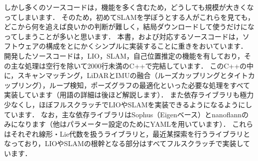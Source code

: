 しかし多くのソースコードは，機能を多く含むため，どうしても規模が大きくなってしまいます．
そのため，初めてSLAMを学ぼうとする人がこれらを見ても，どこから何を追えば良いかの判断が難しく，結局ダウンロードして使うだけになってしまうことが多いと思います．
本書，および対応するソースコードは，ソフトウェアの構成をとにかくシンプルに実装することに重きをおいています．
開発したソースコードは，LIO，SLAM，自己位置推定の機能を有しており，その主な処理は空行を除いて2000行未満のC++で完結しています．
このC++の中に，スキャンマッチング，LiDARとIMUの融合（ルーズカップリングとタイトカップリング），ループ検知，ポーズグラフの最適化といった必要な処理をすべて実装しています（用語の詳細は後ほど解説します）．
また依存ライブラリも極力少なくし，ほぼフルスクラッチでLIOやSLAMを実装できるようになるようにしています．
なお，主な依存ライブラリはSophus（Eigenベース）とnanoflannのみになります（他はパラメーター設定のためにYAMLを用いています）．
これらはそれぞれ線形・Lie代数を扱うライブラリと，最近某探索を行うライブラリとなっており，LIOやSLAMの根幹となる部分はすべてフルスクラッチで実装しています．















